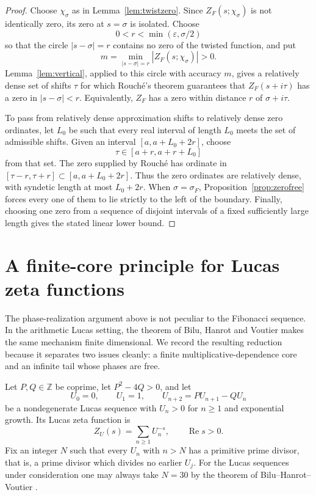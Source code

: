 \documentclass[11pt]{article}
\theoremstyle{remark}
\newcommand{\ZF}{Z_F}
\newcommand{\Ree}{\operatorname{Re}}
\begin{document}
\begin{proof}
Choose $\chi_\sigma$ as in Lemma~\ref{lem:twistzero}.  Since $\ZF(s;\chi_\sigma)$ is not identically zero, its zero at $s=\sigma$ is isolated.  Choose
\[
0<r<\min(\varepsilon,\sigma/2)
\]
so that the circle $|s-\sigma|=r$ contains no zero of the twisted function, and put
\[
m=\min_{|s-\sigma|=r}|\ZF(s;\chi_\sigma)|>0.
\]
Lemma~\ref{lem:vertical}, applied to this circle with accuracy $m$, gives a relatively dense set of shifts $\tau$ for which Rouch\'e's theorem guarantees that $\ZF(s+i\tau)$ has a zero in $|s-\sigma|<r$.  Equivalently, $\ZF$ has a zero within distance $r$ of $\sigma+i\tau$.

To pass from relatively dense approximation shifts to relatively dense zero ordinates, let $L_0$ be such that every real interval of length $L_0$ meets the set of admissible shifts.  Given an interval $[a,a+L_0+2r]$, choose
\[
\tau\in[a+r,a+r+L_0]
\]
from that set.  The zero supplied by Rouch\'e has ordinate in $[\tau-r,\tau+r]\subset[a,a+L_0+2r]$.  Thus the zero ordinates are relatively dense, with syndetic length at most $L_0+2r$.  When $\sigma=\sigma_F$, Proposition~\ref{prop:zerofree} forces every one of them to lie strictly to the left of the boundary.  Finally, choosing one zero from a sequence of disjoint intervals of a fixed sufficiently large length gives the stated linear lower bound.
\end{proof}




\section{A finite-core principle for Lucas zeta functions}\label{sec:lucas}

The phase-realization argument above is not peculiar to the Fibonacci sequence.  In the arithmetic Lucas setting, the theorem of Bilu, Hanrot and Voutier makes the same mechanism finite dimensional.  We record the resulting reduction because it separates two issues cleanly: a finite multiplicative-dependence core and an infinite tail whose phases are free.

Let $P,Q\in\mathbb Z$ be coprime, let $P^2-4Q>0$, and let
\[
U_0=0,\qquad U_1=1,\qquad U_{n+2}=P U_{n+1}-Q U_n
\]
be a nondegenerate Lucas sequence with $U_n>0$ for $n\ge1$ and exponential growth.  Its Lucas zeta function is
\[
Z_U(s)=\sum_{n\ge1}U_n^{-s},\qquad \Ree s>0.
\]
Fix an integer $N$ such that every $U_n$ with $n>N$ has a primitive prime divisor, that is, a prime divisor which divides no earlier $U_j$.  For the Lucas sequences under consideration one may always take $N=30$ by the theorem of Bilu--Hanrot--Voutier \cite{BHV2001}.
\end{document}
